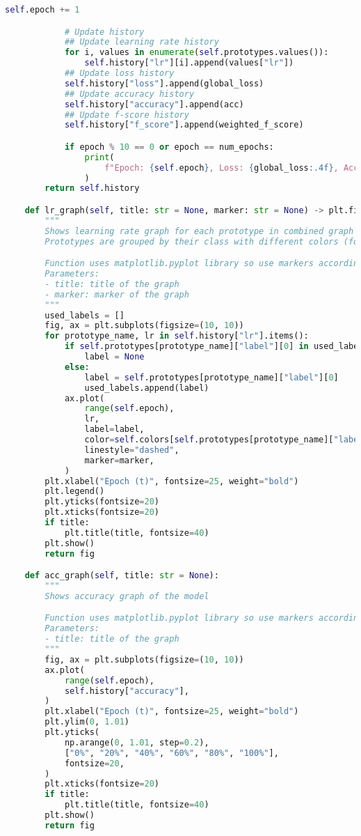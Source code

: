 \begin{lstlisting}[language = python]
            self.epoch += 1

            # Update history
            ## Update learning rate history
            for i, values in enumerate(self.prototypes.values()):
                self.history["lr"][i].append(values["lr"])
            ## Update loss history
            self.history["loss"].append(global_loss)
            ## Update accuracy history
            self.history["accuracy"].append(acc)
            ## Update f-score history
            self.history["f_score"].append(weighted_f_score)

            if epoch % 10 == 0 or epoch == num_epochs:
                print(
                    f"Epoch: {self.epoch}, Loss: {global_loss:.4f}, Accuracy: {acc*100:.2f} %, F_{f_name}_score: {weighted_f_score*100:.2f} %"
                )
        return self.history

    def lr_graph(self, title: str = None, marker: str = None) -> plt.figure:
        """
        Shows learning rate graph for each prototype in combined graph
        Prototypes are grouped by their class with different colors (for now max 3 colors)

        Function uses matplotlib.pyplot library so use markers according to matplotlib.pyplot library
        Parameters:
        - title: title of the graph
        - marker: marker of the graph
        """
        used_labels = []
        fig, ax = plt.subplots(figsize=(10, 10))
        for prototype_name, lr in self.history["lr"].items():
            if self.prototypes[prototype_name]["label"][0] in used_labels:
                label = None
            else:
                label = self.prototypes[prototype_name]["label"][0]
                used_labels.append(label)
            ax.plot(
                range(self.epoch),
                lr,
                label=label,
                color=self.colors[self.prototypes[prototype_name]["label"][0]],
                linestyle="dashed",
                marker=marker,
            )
        plt.xlabel("Epoch (t)", fontsize=25, weight="bold")
        plt.legend()
        plt.yticks(fontsize=20)
        plt.xticks(fontsize=20)
        if title:
            plt.title(title, fontsize=40)
        plt.show()
        return fig

    def acc_graph(self, title: str = None):
        """
        Shows accuracy graph of the model

        Function uses matplotlib.pyplot library so use markers according to matplotlib.pyplot library
        Parameters:
        - title: title of the graph
        """
        fig, ax = plt.subplots(figsize=(10, 10))
        ax.plot(
            range(self.epoch),
            self.history["accuracy"],
        )
        plt.xlabel("Epoch (t)", fontsize=25, weight="bold")
        plt.ylim(0, 1.01)
        plt.yticks(
            np.arange(0, 1.01, step=0.2),
            ["0%", "20%", "40%", "60%", "80%", "100%"],
            fontsize=20,
        )
        plt.xticks(fontsize=20)
        if title:
            plt.title(title, fontsize=40)
        plt.show()
        return fig


\end{lstlisting}
